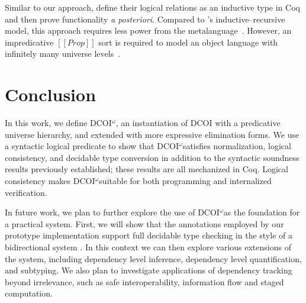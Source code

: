 \documentclass[acmsmall, screen=true, nonacm=true,
  review=\ifpublic false\else true\fi,
  anonymous=\ifanonymous true\else false\fi
]{acmart}
\makeatletter
\newcommand{\sw}[1]{}
\newcommand{\jc}[1]{}
\newcommand{\dcoi}{DCOI\@\xspace}
\newcommand{\name}{\texorpdfstring{DCOI$^{\omega}$\@\xspace}{DCOI-omega}}
\newcommand{\aposteriori}{\textit{a posteriori}\@\xspace}
\makeatother
\begin{document}
Similar to our approach, \citet{anand:corenuprl,
wieczorek:coqnbe, adjedj:mltt-coq} define their logical relations
as an inductive type in Coq and then prove functionality \aposteriori.
Compared to \citet{abel:dectt}'s
inductive--recursive model, this approach requires less power from the
metalanguage~\citep{adjedj:mltt-coq}. However, an impredicative
$[[Prop]]$ sort is required to model an object language with infinitely
many universe levels~\citep{anand:corenuprl}.




\section{Conclusion}

In this work, we define \name, an instantiation of \dcoi with a
predicative universe hierarchy, and extended with more expressive
elimination forms. We use a syntactic logical predicate to show that
\name satisfies normalization, logical consistency, and decidable type
conversion in addition to the syntactic soundness results previously established; these results are all mechanized in Coq.
Logical consistency makes \name suitable for both
programming and internalized verification.
\jc{I don't think logical consistency says anything about programming
and we probably shouldn't mention information flow
if all of our examples have been about irrelevance?}
\sw{I removed information flow, but I'd like to get a hint of trellys
style termination modalities here...}

In future work, we plan to further explore the use of \name as the foundation for a practical system. First, we will show that the annotations employed by our prototype implementation support full
decidable type checking in the style of a bidirectional system
\citet{dunfield-krishnaswami:bidirection,adjedj:mltt-coq}. In this context we can then explore various extensions of the system, including dependency level inference, dependency level quantification, and subtyping. We also plan to investigate applications of dependency tracking beyond irrelevance, such as safe interoperability, information flow and staged computation. \sw{Also mention inductive datatypes? Prop sort? type-directed equality? }

\end{document}
